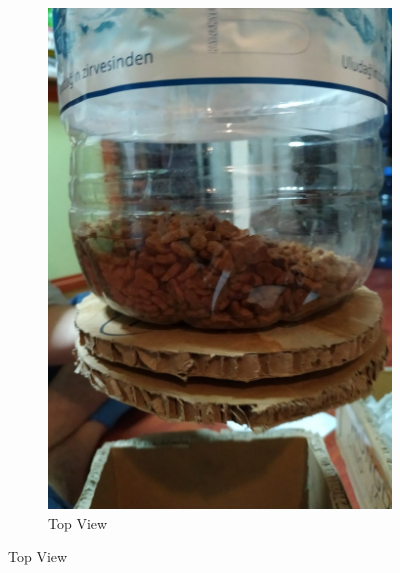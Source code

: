 \begin{figure}[h]
\begin{subfigure}[b]{0.49\linewidth}
        \includegraphics[width=\linewidth]{Mech3.jpeg}
        \caption{Top View}
        \label{fig:doga2}
    \end{subfigure}
  
\end{figure}

